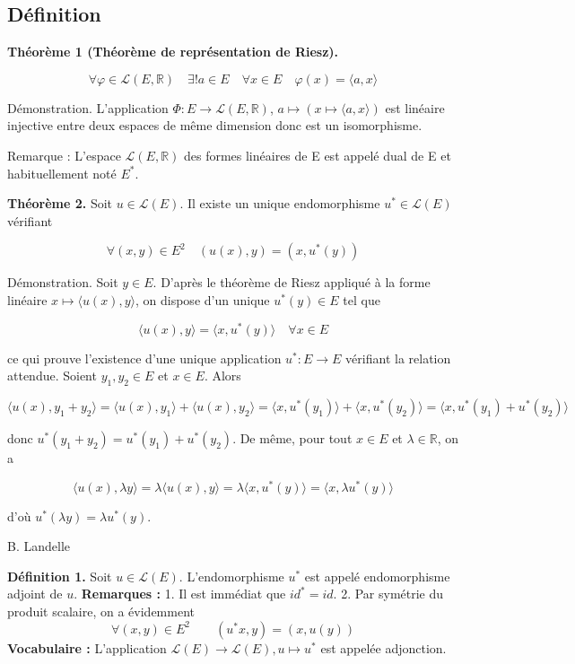 \subsection{Définition}

\textbf{Théorème 1 (Théorème de représentation de Riesz).}

\[ \forall \varphi \in \mathcal{L}(E, \mathbb{R}) \quad \exists ! a \in E \quad \forall x \in E \quad \varphi(x) = \langle a, x \rangle \]

Démonstration. L'application $\Phi : E \to \mathcal{L}(E, \mathbb{R})$, $a \mapsto (x \mapsto \langle a, x \rangle)$ est linéaire injective entre deux espaces de même dimension donc est un isomorphisme.

Remarque : L'espace $\mathcal{L}(E, \mathbb{R})$ des formes linéaires de E est appelé dual de E et habituellement noté $E^*$.

\textbf{Théorème 2.} Soit $u \in \mathcal{L}(E)$. Il existe un unique endomorphisme $u^* \in \mathcal{L}(E)$ vérifiant

\[ \forall (x, y) \in E^2 \quad (u(x), y) = (x, u^*(y)) \]

Démonstration. Soit $y \in E$. D'après le théorème de Riesz appliqué à la forme linéaire $x \mapsto \langle u(x), y \rangle$, on dispose d'un unique $u^*(y) \in E$ tel que

\[ \langle u(x), y \rangle = \langle x, u^*(y) \rangle \quad \forall x \in E \]

ce qui prouve l'existence d'une unique application $u^* : E \to E$ vérifiant la relation attendue.
Soient $y_1, y_2 \in E$ et $x \in E$. Alors

\[ \langle u(x), y_1 + y_2 \rangle = \langle u(x), y_1 \rangle + \langle u(x), y_2 \rangle = \langle x, u^*(y_1) \rangle + \langle x, u^*(y_2) \rangle = \langle x, u^*(y_1) + u^*(y_2) \rangle \]

donc $u^*(y_1 + y_2) = u^*(y_1) + u^*(y_2)$. De même, pour tout $x \in E$ et $\lambda \in \mathbb{R}$, on a

\[ \langle u(x), \lambda y \rangle = \lambda \langle u(x), y \rangle = \lambda \langle x, u^*(y) \rangle = \langle x, \lambda u^*(y) \rangle \]

d'où $u^*(\lambda y) = \lambda u^*(y)$.

B. Landelle

\textbf{Définition 1.} Soit $u \in \mathcal{L}(E)$. L'endomorphisme $u^*$ est appelé endomorphisme adjoint de $u$.
\textbf{Remarques :} 1. Il est immédiat que $id^* = id$.
2. Par symétrie du produit scalaire, on a évidemment
\[ \forall (x,y) \in E^2 \qquad (u^*x, y) = (x, u(y)) \]
\textbf{Vocabulaire :} L'application $\mathcal{L}(E) \to \mathcal{L}(E), u \mapsto u^*$ est appelée adjonction.

